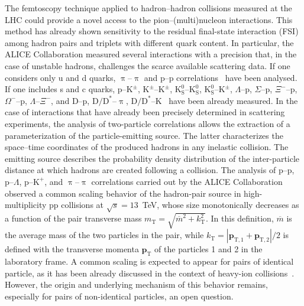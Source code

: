 \documentclass[ALICE,manyauthors]{cernphprep}
\begin{document}
The femtoscopy technique applied to hadron--hadron collisions measured at the LHC could provide a novel access to the pion--(multi)nucleon interactions. This method has already shown sensitivity to the residual final-state interaction (FSI) among hadron pairs and triplets with different quark content. In particular, the ALICE Collaboration measured several interactions with a precision that, in the case of unstable hadrons, challenges the scarce available scattering data. If one considers only u and d quarks, $\uppi$--$\uppi$ and p--p correlations~\cite{ALICE:2023sjd, ALICE:2018ysd, ppSourceErratum} have been analysed. If one includes s and c  quarks, $\text{p--}\text{K}^\pm$, $\text{K}^\pm$--$\text{K}^\pm$, $\text{K}_\text{S}^0$--$\text{K}_\text{S}^0$, $\text{K}_\text{S}^0$--$\text{K}^\pm$, $\Lambda$--p, $\Sigma$--p, $\Xi^-$--p, $\Omega^-$--p, $\Lambda$--$\Xi^-$, and $\text{D}$--p, $\text{D}/\text{D}^*$--$\uppi$, $\text{D}/\text{D}^*$--$\text{K}$~\cite{ALICE:2019gcn, ALICE:2021njx, ALICE:2019buq, ALICE:2019hdt, ALICE:2020mfd, ALICE:2022uso, ALICE:2022enj, ALICE:2024bhk, ALICE:2023zbh, ALICE:2021ovd} have been already measured.
In the case of interactions that have already been precisely determined in scattering experiments, the analysis of two-particle correlations allows the extraction of a parameterization of the particle-emitting source. The latter characterizes the space--time coordinates of the produced hadrons in any inelastic collision. The emitting source describes the probability density distribution of the inter-particle distance at which hadrons are created following a collision. The analysis of p--p, $\text{p--}\Lambda$, $\text{p--}\text{K}^+$, and $\uppi$--$\uppi$ correlations carried out by the ALICE Collaboration~\cite{ppSourceErratum,ALICE:2023sjd,Mihaylov:2023pyl} observed a common scaling behavior of the hadron-pair source in high-multiplicity pp collisions at $\sqrt{s}=13$~TeV, whose size monotonically decreases as a function of the pair transverse mass $m_\text{T} = \sqrt{\overline{m}^2 + k_\text{T} ^2}$. In this definition, $\overline{m}$ is the average mass of the two particles in the pair, while $k_\text{T} = |\mathbf{p}_{\text{T},1} + \mathbf{p}_{\text{T},2}|/2$ is defined with the transverse momenta $\mathbf{p}_{\text{T}}$ of the particles 1 and 2 in the laboratory frame. A common scaling is expected to appear for pairs of identical particle, as it has been already discussed in the context of heavy-ion collisions~\cite{Lisa:2005dd, Kisiel:2009eh}. However, the origin and underlying mechanism of this behavior remains, especially for pairs of non-identical particles, an open question.
\end{document}
